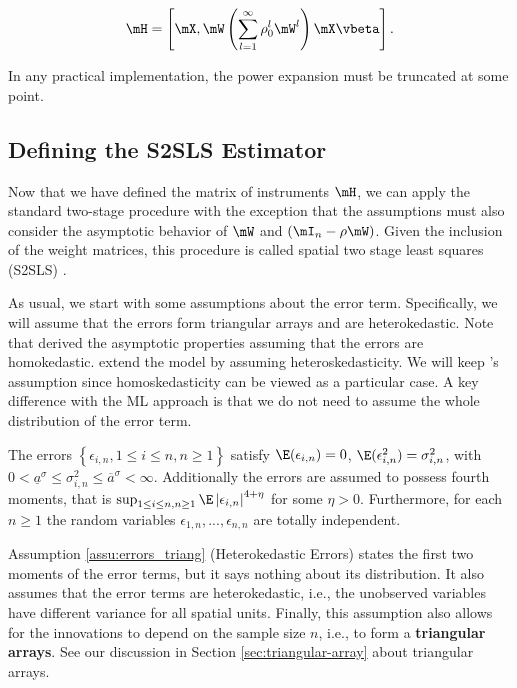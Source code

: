 \documentclass[english,12pt]{book}\usepackage[]{graphicx}\usepackage[]{xcolor}
\begin{document}
\begin{equation*}
\mH =\left[\mX, \mW\left(\sum_{l = 1}^{\infty}\rho_0^{l}\mW^l\right)\mX\vbeta\right].
\end{equation*}

In any practical implementation, the power expansion must be truncated at some point. 

\subsection{Defining the S2SLS Estimator}

Now that we have defined the matrix of instruments $\mH$, we can apply the standard two-stage procedure with the exception that the assumptions must also consider the asymptotic behavior of $\mW$ and $(\mI_n - \rho\mW)$. Given the inclusion of the weight matrices, this procedure is called spatial two stage least squares (S2SLS) \citep{kelejian1998generalized}. 

As usual, we start with some assumptions about the error term. Specifically, we will assume that the errors form triangular arrays and are heterokedastic. Note that \cite{kelejian1998generalized} derived the asymptotic properties assuming that the errors are homokedastic. \cite{kelejian2010specification} extend the model by assuming heteroskedasticity. We will keep \cite{kelejian2010specification}'s assumption since homoskedasticity can be viewed as a particular case. A key difference with the ML approach is that we do not need to assume the whole distribution of the error term. 

\begin{assumption}\label{assu:errors_triang}
The errors  $\left\lbrace \epsilon_{i,n}, 1 \leq i \leq n, n\geq 1\right\rbrace$ satisfy $\E(\epsilon_{i,n})= 0$, $\E(\epsilon_{i,n}^2) = \sigma^2_{i,n}$, with $0 < \underline{a}^\sigma \leq \sigma^2_{i,n}\leq \overline{a}^\sigma<\infty$. Additionally the errors are assumed to possess fourth moments, that is $\sup_{1\leq i \leq n, n\geq 1}\E\left|\epsilon_{i, n}\right|^{4 + \eta}$ for some $\eta > 0$.  Furthermore, for each $n\geq 1$ the random variables $\epsilon_{1, n}, ..., \epsilon_{n, n}$ are totally independent. 
\end{assumption}

Assumption \ref{assu:errors_triang} (Heterokedastic Errors) states the first two moments of the error terms, but it says nothing about its distribution. It also assumes that the error terms are heterokedastic, i.e., the unobserved variables have different variance for all spatial units. Finally, this assumption also allows for the innovations to depend on the sample size $n$, i.e., to form a \textbf{triangular arrays}. See our discussion in Section \ref{sec:triangular-array} about triangular arrays. 
\end{document}
